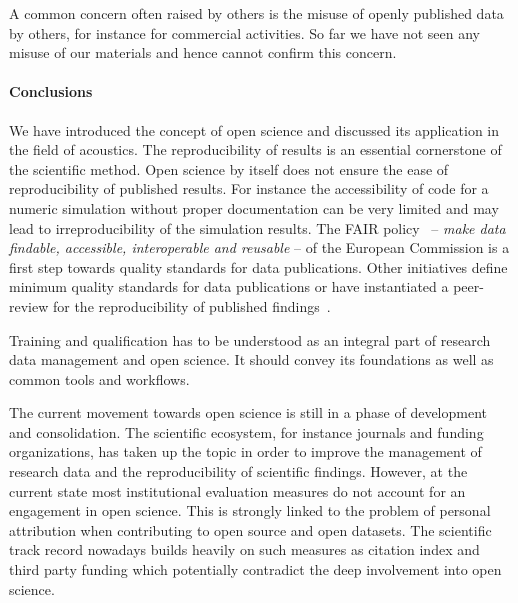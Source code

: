 \documentclass[a4paper, 10pt, twocolumn]{article}
\begin{document}
A common concern often raised by others is the misuse of openly published data by others, 
for instance for commercial activities. So far we have not seen any misuse of our
materials and hence cannot confirm this concern.

\paragraph*{Conclusions}

We have introduced the concept of open science and discussed its application in the
field of acoustics. The reproducibility of results is an essential cornerstone of
the scientific method. Open science by itself does not ensure the ease of reproducibility of
published results. For instance the accessibility of code for a numeric simulation without
proper documentation can be very limited and may lead to irreproducibility of the simulation results. 
The FAIR policy~\cite{H2020_FAIR:ERC} -- \emph{make data findable, accessible, interoperable and reusable} -- 
of the European Commission is a first step towards quality standards for 
data publications. Other initiatives define minimum quality standards for data publications 
or have instantiated a peer-review for the reproducibility of published findings~\cite{}.  

Training and qualification has to be understood as an integral part of research data 
management and open science. It should convey its foundations as well as common tools 
and workflows.

The current movement towards open science is still in a phase of development and 
consolidation. The scientific ecosystem, for instance journals and funding organizations, 
has taken up the topic in order to improve the management of research data and the 
reproducibility of scientific findings. However, at the current state most institutional 
evaluation measures do not account for an engagement in open science. This is strongly 
linked to the problem of personal attribution when contributing to open source and open 
datasets. The scientific track record nowadays builds heavily on such measures as 
citation index and third party funding which potentially contradict the deep involvement 
into open science.

{


}
\end{document}
